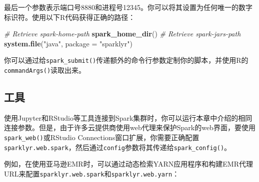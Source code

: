 \documentclass[
]{article}
\newenvironment{Shaded}{\begin{snugshade}}{\end{snugshade}}
\newcommand{\CommentTok}[1]{\textcolor[rgb]{0.56,0.35,0.01}{\textit{#1}}}
\newcommand{\DataTypeTok}[1]{\textcolor[rgb]{0.13,0.29,0.53}{#1}}
\newcommand{\ErrorTok}[1]{\textcolor[rgb]{0.64,0.00,0.00}{\textbf{#1}}}
\newcommand{\KeywordTok}[1]{\textcolor[rgb]{0.13,0.29,0.53}{\textbf{#1}}}
\newcommand{\NormalTok}[1]{#1}
\newcommand{\OperatorTok}[1]{\textcolor[rgb]{0.81,0.36,0.00}{\textbf{#1}}}
\newcommand{\StringTok}[1]{\textcolor[rgb]{0.31,0.60,0.02}{#1}}
\begin{document}
最后一个参数表示端口号8880和进程号12345。你可以将其设置为任何唯一的数字标识符。使用以下R代码获得正确的路径：

\begin{Shaded}
\begin{Highlighting}[]
\CommentTok{# Retrieve spark-home-path}
\KeywordTok{spark_home_dir}\NormalTok{()}
\CommentTok{# Retrieve spark-jars-path}
\KeywordTok{system.file}\NormalTok{(}\StringTok{"java"}\NormalTok{, }\DataTypeTok{package =} \StringTok{"sparklyr"}\NormalTok{)}
\end{Highlighting}
\end{Shaded}

你可以通过给\texttt{spark\_submit()}传递额外的命令行参数定制你的脚本，并使用R的\texttt{commandArgs()}读取出来。

\hypertarget{ux5de5ux5177-1}{%
\subsection{工具}\label{ux5de5ux5177-1}}

使用Jupyter和RStudio等工具连接到Spark集群时，你可以运行本章中介绍的相同连接参数。但是，由于许多云提供商使用web代理来保护Spark的web界面，要使用\texttt{spark\_web()}或RStudio
Connections窗口扩展，你需要正确配置\texttt{sparklyr.web.spark}，然后通过\texttt{config}参数将其传递给\texttt{spark\_config()}。

例如，在使用亚马逊EMR时，可以通过动态检索YARN应用程序和构建EMR代理URL来配置\texttt{sparklyr.web.spark}和\texttt{sparklyr.web.yarn}：

\begin{Shaded}
\end{Shaded}
\end{document}
